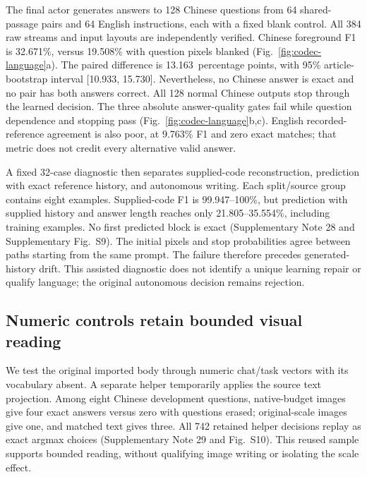 \documentclass[12pt,a4paper]{article}
\newcommand{\CodecLanguageFOne}{32.671}
\newcommand{\CodecLanguageBlankFOne}{19.508}
\newcommand{\CodecLanguageQuestionGain}{13.163}
\newcommand{\CodecLanguageCILow}{10.933}
\newcommand{\CodecLanguageCIHigh}{15.730}
\begin{document}
The final actor generates answers to 128 Chinese questions from 64
shared-passage pairs and 64 English instructions, each with a fixed blank
control. All 384 raw streams and input layouts are independently verified.
Chinese foreground F1 is \CodecLanguageFOne\%, versus
\CodecLanguageBlankFOne\% with question pixels blanked
(Fig.~\ref{fig:codec-language}a). The paired difference is
\CodecLanguageQuestionGain\ percentage points, with 95\% article-bootstrap
interval [\CodecLanguageCILow, \CodecLanguageCIHigh]. Nevertheless, no
Chinese answer is exact and no pair has both answers correct. All 128 normal
Chinese outputs stop through the learned decision. The three absolute
answer-quality gates fail while question dependence and stopping pass
(Fig.~\ref{fig:codec-language}b,c). English recorded-reference agreement is
also poor, at 9.763\% F1 and zero exact matches; that metric does not credit
every alternative valid answer.

A fixed 32-case diagnostic then separates supplied-code reconstruction,
prediction with exact reference history, and autonomous writing. Each
split/source group contains eight examples. Supplied-code F1 is
99.947--100\%, but prediction with supplied history and answer length reaches
only 21.805--35.554\%, including training examples. No first predicted block
is exact (Supplementary Note 28 and Supplementary Fig.~S9).
The initial pixels and stop probabilities agree between paths starting from
the same prompt. The failure therefore precedes generated-history drift.
This assisted diagnostic does not identify a unique learning repair or qualify
language; the original autonomous decision remains rejection.


\subsection*{Numeric controls retain bounded visual reading}
We test the original imported body through numeric chat/task vectors with
its vocabulary absent. A separate helper temporarily applies the source text
projection. Among eight Chinese development questions, native-budget images
give four exact answers versus zero with questions erased; original-scale
images give one, and matched text gives three. All 742 retained helper
decisions replay as exact argmax choices (Supplementary Note 29 and Fig.~S10). This reused
sample supports bounded reading, without qualifying image writing or
isolating the scale effect.
\end{document}
